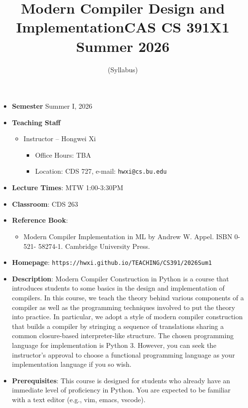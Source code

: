 \documentclass[11pt]{article}
\title{Modern Compiler Design and Implementation\break CAS CS 391X1 Summer 2026}
\author{(Syllabus)}
\date{}
\begin{document}
\maketitle
\thispagestyle{empty}

\begin{itemize}
\item
{\bf Semester}
Summer I, 2026
\item
{\bf Teaching Staff}
\begin{itemize}
\item
Instructor -- Hongwei Xi
\begin{itemize}
\item
Office Hours: TBA
\item
Location: CDS 727, e-mail: \texttt{hwxi@cs.bu.edu}
\end{itemize}
\end{itemize}

\item {\bf Lecture Times}: MTW 1:00-3:30PM
\item {\bf Classroom}: CDS 263
\item {\bf Reference Book}:\kern6pt
\begin{itemize}
\item
Modern Compiler Implementation in ML by Andrew W. Appel. ISBN 0-521-
58274-1. Cambridge University Press.
\end{itemize}

\item {\bf Homepage}:
{\tt  https://hwxi.github.io/TEACHING/CS391/2026Sum1}

\item {\bf Description}:
Modern Compiler Construction in Python is a course that introduces
students to some basics in the design and implementation of
compilers. In this course, we teach the theory behind various
components of a compiler as well as the programming techniques
involved to put the theory into practice. In particular, we adopt a
style of modern compiler construction that builds a compiler by
stringing a sequence of translations sharing a common closure-based
interpreter-like structure.  The chosen programming language for
implementation is Python 3. However, you can seek the instructor’s
approval to choose a functional programming language as your
implementation language if you so wish.

\item {\bf Prerequisites}:
This course is designed for students who already have an immediate
level of proficiency in Python. You are expected to be familiar with a
text editor (e.g., vim, emacs, vscode).


\end{itemize}
\end{document}
